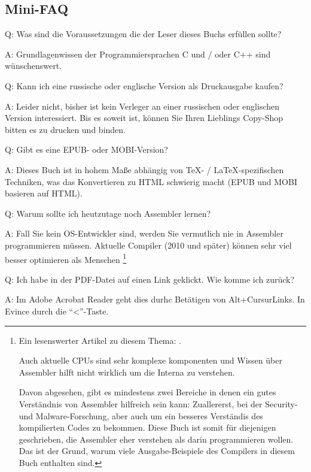\subsection*{Mini-FAQ}

\par Q: Was sind die Voraussetzungen die der Leser dieses Buchs erfüllen sollte?
\par A: Grundlagenwissen der Programmiersprachen C und / oder C++ sind wünschenswert.

\par Q: Kann ich eine russische oder englische Version als Druckausgabe kaufen?
\par A: Leider nicht, bisher ist kein Verleger an einer russischen oder englischen Version interessiert.
Bis es soweit ist, können Sie Ihren Lieblings Copy-Shop bitten es zu drucken und binden.

\par Q: Gibt es eine EPUB- oder MOBI-Version?
\par A: Dieses Buch ist in hohem Maße abhängig von \TeX{}- / \LaTeX{}-spezifischen Techniken,
was das Konvertieren zu HTML schwierig macht (EPUB und MOBI basieren auf HTML).

\par Q: Warum sollte ich heutzutage noch Assembler lernen?
\par A: Fall Sie kein \ac{OS}-Entwickler sind, werden Sie vermutlich nie in Assembler programmieren müssen.\textemdash{}
Aktuelle Compiler (2010 und später) können sehr viel besser optimieren als Menschen \footnote{Ein lesenswerter Artikel zu diesem Thema: \InSqBrackets{\AgnerFog}.

Auch aktuelle \ac{CPU}s sind sehr komplexe komponenten und Wissen über Assembler hilft nicht wirklich
um die Interna zu verstehen.

Davon abgesehen, gibt es mindestens zwei Bereiche in denen ein gutes Verständnis von Assembler hilfreich
sein kann: Zuallererst, bei der Security- und Malware-Forschung, aber auch um ein besseres Verständis des kompilierten
Codes zu bekommen.
Diese Buch ist somit für diejenigen geschrieben, die Assembler eher verstehen als darin programmieren wollen.
Das ist der Grund, warum viele Ausgabe-Beispiele des Compilers in diesem Buch enthalten sind.}

\par Q: Ich habe in der PDF-Datei auf einen Link geklickt. Wie komme ich zurück?
\par A: Im Adobe Acrobat Reader geht dies durhc Betätigen von Alt+CursurLinks.
In Evince durch die ``<''-Taste.

